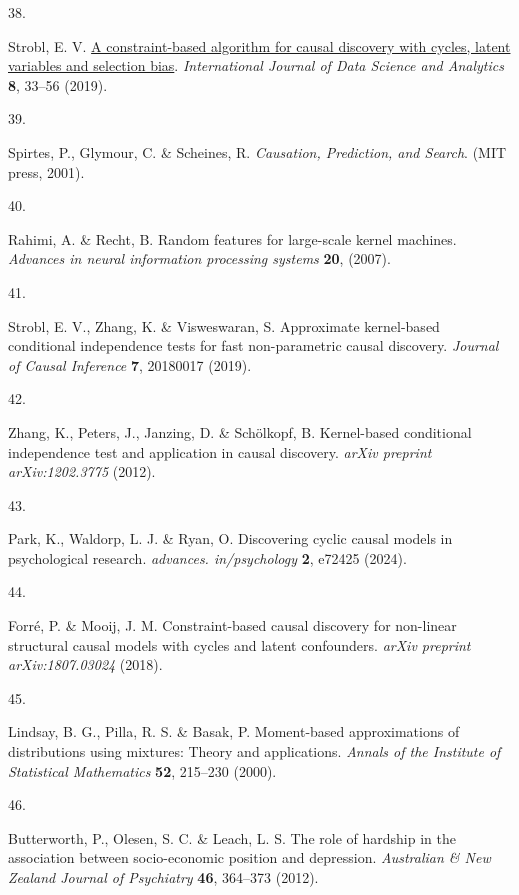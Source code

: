 \documentclass[
]{article}
\newlength{\cslhangindent}
\newlength{\csllabelwidth}
\newenvironment{CSLReferences}[2] %
 {\begin{list}{}{%
  \setlength{\itemindent}{0pt}
  \setlength{\leftmargin}{0pt}
  \setlength{\parsep}{0pt}
  \ifodd #1
   \setlength{\leftmargin}{\cslhangindent}
   \setlength{\itemindent}{-1\cslhangindent}
  \fi
  \setlength{\itemsep}{#2\baselineskip}}}
 {\end{list}}
\newcommand{\CSLLeftMargin}[1]{\parbox[t]{\csllabelwidth}{\strut#1\strut}}
\newcommand{\CSLRightInline}[1]{\parbox[t]{\linewidth - \csllabelwidth}{\strut#1\strut}}
\begin{document}
\begin{CSLReferences}{0}{0}
\CSLLeftMargin{38. }%
\CSLRightInline{Strobl, E. V.
\href{https://doi.org/10.1007/s41060-018-0158-2}{A constraint-based
algorithm for causal discovery with cycles, latent variables and
selection bias}. \emph{International Journal of Data Science and
Analytics} \textbf{8}, 33--56 (2019).}

\CSLLeftMargin{39. }%
\CSLRightInline{Spirtes, P., Glymour, C. \& Scheines, R.
\emph{Causation, Prediction, and Search}. (MIT press, 2001).}

\CSLLeftMargin{40. }%
\CSLRightInline{Rahimi, A. \& Recht, B. Random features for large-scale
kernel machines. \emph{Advances in neural information processing
systems} \textbf{20}, (2007).}

\CSLLeftMargin{41. }%
\CSLRightInline{Strobl, E. V., Zhang, K. \& Visweswaran, S. Approximate
kernel-based conditional independence tests for fast non-parametric
causal discovery. \emph{Journal of Causal Inference} \textbf{7},
20180017 (2019).}

\CSLLeftMargin{42. }%
\CSLRightInline{Zhang, K., Peters, J., Janzing, D. \& Schölkopf, B.
Kernel-based conditional independence test and application in causal
discovery. \emph{arXiv preprint arXiv:1202.3775} (2012).}

\CSLLeftMargin{43. }%
\CSLRightInline{Park, K., Waldorp, L. J. \& Ryan, O. Discovering cyclic
causal models in psychological research. \emph{advances. in/psychology}
\textbf{2}, e72425 (2024).}

\CSLLeftMargin{44. }%
\CSLRightInline{Forré, P. \& Mooij, J. M. Constraint-based causal
discovery for non-linear structural causal models with cycles and latent
confounders. \emph{arXiv preprint arXiv:1807.03024} (2018).}

\CSLLeftMargin{45. }%
\CSLRightInline{Lindsay, B. G., Pilla, R. S. \& Basak, P. Moment-based
approximations of distributions using mixtures: Theory and applications.
\emph{Annals of the Institute of Statistical Mathematics} \textbf{52},
215--230 (2000).}

\CSLLeftMargin{46. }%
\CSLRightInline{Butterworth, P., Olesen, S. C. \& Leach, L. S. The role
of hardship in the association between socio-economic position and
depression. \emph{Australian \& New Zealand Journal of Psychiatry}
\textbf{46}, 364--373 (2012).}


\end{CSLReferences}
\end{document}
